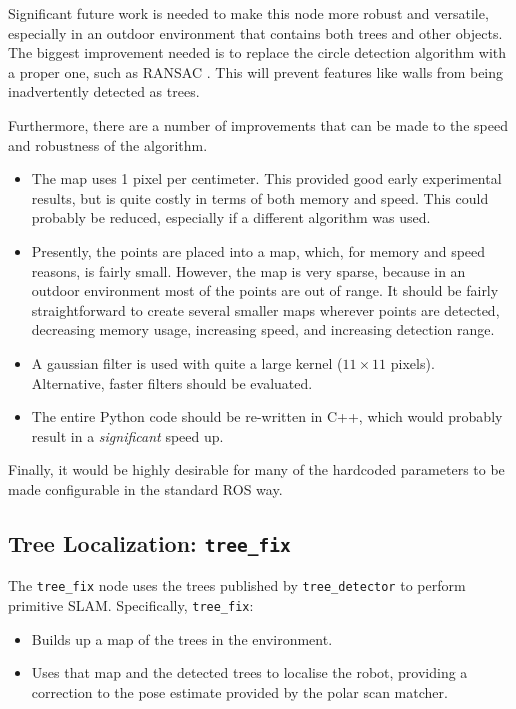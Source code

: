 \documentclass[12pt,oneside,a4paper]{book}
\begin{document}
Significant future work is needed to make this node more
robust and versatile, especially in an outdoor environment that
contains both trees and other objects. The biggest improvement needed
is to replace the circle detection algorithm with a proper one, such
as RANSAC . This will prevent features like walls from
being inadvertently detected as trees.

Furthermore, there are a number of improvements that can be made to
the speed and robustness of the algorithm.
\begin{itemize}
\item The map uses 1 pixel per centimeter. This provided good early
  experimental results, but is quite costly in terms of both memory
  and speed. This could probably be reduced, especially if a different
  algorithm was used.
\item Presently, the points are placed into a map, which, for memory
  and speed reasons, is fairly small. However, the map is very sparse,
  because in an outdoor environment most of the points are out of range.
  It should be fairly straightforward to create several smaller maps
  wherever points are detected, decreasing memory usage, increasing
  speed, and increasing detection range.
\item A gaussian filter is used with quite a large kernel ($11 \times
  11$ pixels). Alternative, faster filters should be evaluated.
\item The entire Python code should be re-written in C++, which would
  probably result in a \emph{significant} speed up.
\end{itemize}

Finally, it would be highly desirable for many of the hardcoded
parameters to be made configurable in the standard ROS way.

\subsection{Tree Localization: \texttt{tree\_fix}}
\label{sec:tree_fix}

The \texttt{tree\_fix} node uses the trees published by
\texttt{tree\_detector} to perform primitive SLAM. Specifically, \texttt{tree\_fix}:
\begin{itemize}
\item Builds up a map of the trees in the environment.
\item Uses that map and the detected trees to localise the robot,
  providing a correction to the pose estimate provided by the polar
  scan matcher.
\end{itemize}
\end{document}
